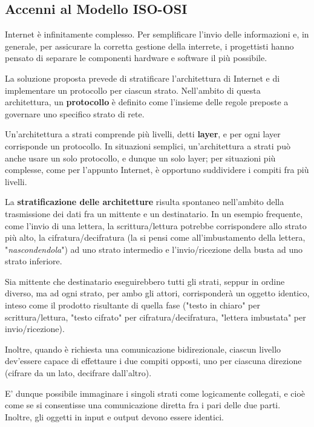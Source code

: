 \subsection{Accenni al Modello ISO-OSI}
    Internet è infinitamente complesso. Per semplificare l'invio delle informazioni e, in generale, per assicurare la corretta gestione della interrete, i progettisti hanno pensato di separare le componenti hardware e software il più possibile.

    \vspace{3mm}
    
    La soluzione proposta prevede di stratificare l'architettura di Internet e di implementare un protocollo per ciascun strato. Nell'ambito di questa architettura, un \textbf{protocollo} è definito come l'insieme delle regole preposte a governare uno specifico strato di rete.
    
    \vspace{3mm}
    
    Un'architettura a strati comprende più livelli, detti \textbf{layer}, e per ogni layer corrisponde un protocollo. In situazioni semplici, un'architettura a strati può anche usare un solo protocollo, e dunque un solo layer; per situazioni più complesse, come per l'appunto Internet, è opportuno suddividere i compiti fra più livelli.
    
    La \textbf{stratificazione delle architetture} risulta spontaneo nell'ambito della trasmissione dei dati fra un mittente e un destinatario. In un esempio frequente, come l'invio di una lettera, la scrittura/lettura potrebbe corrispondere allo strato più alto, la cifratura/decifratura (la si pensi come all'imbustamento della lettera, "\textit{nascondendola}") ad uno strato intermedio e l'invio/ricezione della busta ad uno strato inferiore. 
    
    Sia mittente che destinatario eseguirebbero tutti gli strati, seppur in ordine diverso, ma ad ogni strato, per ambo gli attori, corrisponderà un oggetto identico, inteso come il prodotto risultante di quella fase ("testo in chiaro" per scrittura/lettura, "testo cifrato" per cifratura/decifratura, "lettera imbustata" per invio/ricezione).
    
    Inoltre, quando è richiesta una comunicazione bidirezionale, ciascun livello dev'essere capace di effettaure i due compiti opposti, uno per ciascuna direzione (cifrare da un lato, decifrare dall'altro).
    
    E' dunque possibile immaginare i singoli strati come logicamente collegati, e cioè come se si consentisse una comunicazione diretta fra i pari delle due parti. Inoltre, gli oggetti in input e output devono essere identici.
    
